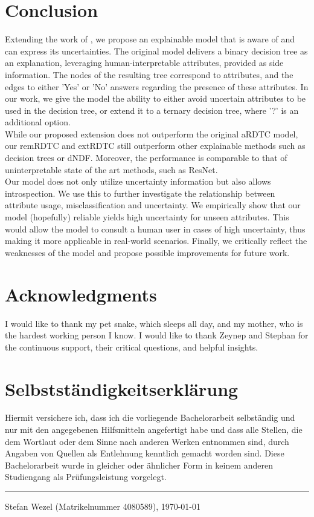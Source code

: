 \documentclass[a4paper,cleardoubleempty,BCOR1cm, 11pt]{report}
\begin{document}
\chapter{Conclusion}
Extending the work of \citet{alaniz2019explainable}, we propose an explainable model that is aware of and can express its uncertainties. The original model delivers a binary decision tree as an explanation, leveraging human-interpretable attributes, provided as side information. The nodes of the resulting tree correspond to attributes, and the edges to either 'Yes' or 'No' answers regarding the presence of these attributes. In our work, we give the model the ability to either avoid uncertain attributes to be used in the decision tree, or extend it to a ternary decision tree, where '?' is an additional option.\\
While our proposed extension does not outperform the original aRDTC model, our remRDTC and extRDTC still outperform other explainable methods such as decision trees or dNDF. Moreover, the performance is comparable to that of uninterpretable state of the art methods, such as ResNet.\\
Our model does not only utilize uncertainty information but also allows introspection. We use this to further investigate the relationship between attribute usage, misclassification and uncertainty.
We empirically show that our model (hopefully) reliable yields high uncertainty for unseen attributes. This would allow the model to consult a human user in cases of high uncertainty, thus making it more applicable in real-world scenarios.
Finally, we critically reflect the weaknesses of the model and propose possible improvements for future work.









\chapter*{Acknowledgments}
I would like to thank my pet snake, which sleeps all day, and my mother, who is the hardest working person I know. I would like to thank Zeynep and Stephan for the continuous support, their critical questions, and helpful insights.



\chapter*{Selbstst\"andigkeitserkl\"arung}
Hiermit versichere ich, dass ich die vorliegende Bachelorarbeit selbst\"andig und
nur mit den angegebenen Hilfsmitteln angefertigt habe und dass alle Stellen,
die dem Wortlaut oder dem Sinne nach anderen Werken entnommen sind,
durch Angaben von Quellen als Entlehnung kenntlich gemacht worden sind.
Diese Bachelorarbeit wurde in gleicher oder \"ahnlicher Form in keinem anderen
Studiengang als Pr\"ufungsleistung vorgelegt.

\vspace*{8ex}
\hrule
\vspace*{2ex}
Stefan Wezel (Matrikelnummer 4080589), \today
\end{document}
